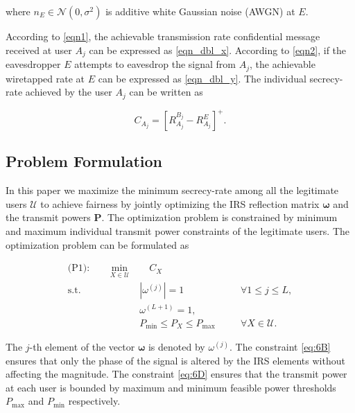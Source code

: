 \documentclass[lettersize,journal]{IEEEtran}
\begin{document}
\noindent where $n_{E} \in \mathcal{N}(0,\sigma^2)$ is additive white Gaussian noise (AWGN) at $E$.

According to \eqref{eqn1}, the achievable transmission rate confidential message received at user $A_j$ can be expressed as \eqref{eqn_dbl_x}. According to \eqref{eqn2}, if the eavesdropper $E$ attempts to eavesdrop the signal from $A_j$, the achievable wiretapped rate at $E$ can be expressed as \eqref{eqn_dbl_y}. The individual secrecy-rate achieved by the user $A_j$ can be written as

\begin{equation}
\label{eqn3}
C_{A_j} = \left[R_{A_j}^{B_j} - R_{A_j}^E \right]^{+}.
\end{equation}



\subsection{Problem Formulation}

In this paper we maximize the minimum secrecy-rate among all the legitimate users $\mathcal{U}$ to achieve fairness by jointly optimizing the IRS reflection matrix $ \boldsymbol{\omega} $ and the transmit powers $\mathbf{P}$. The optimization problem is constrained by minimum and maximum individual transmit power constraints of the legitimate users. The optimization problem can be formulated as



\begin{subequations}\label{eq:6}
\begin{align}
\text{(P1):} \quad \mathop{\max_{\boldsymbol{\omega},\mathbf{P}}} \; \min_{X\in\mathcal{U}} & \quad  C_{X} \label{eq:6A}\\
\textrm{s.t.} \quad & |\omega^{(j)}| = 1 & \quad & \forall 1 \leq j \leq L, \label{eq:6B}\\
  &\omega^{(L+1)} = 1 ,   \label{eq:6C}\\ & P_{\text{min}} \leq P_{X} \leq P_{\text{max}} & \quad & \forall X\in\mathcal{U}. \label{eq:6D}
\end{align}
\end{subequations}

The $j$-th element of the vector $\boldsymbol{\omega}$ is denoted by $\omega^{(j)}$. The constraint \eqref{eq:6B} ensures that only the phase of the signal is altered by the IRS elements without affecting the magnitude. The constraint \eqref{eq:6D} ensures that the transmit power at each user is bounded by maximum and minimum feasible power thresholds $P_{\text{max}}$ and $P_{\text{min}}$ respectively. 
\end{document}
